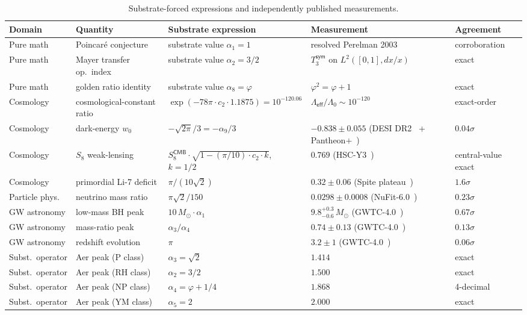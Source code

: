 \documentclass[11pt,a4paper]{amsart}
\theoremstyle{plain}
\theoremstyle{definition}
\begin{document}
\begin{table}[h]
\centering
\caption{Substrate-forced expressions and independently published measurements.}\label{tab:appearances}
\footnotesize
\begin{tabular}{p{1.6cm} p{2.6cm} p{4.5cm} p{2.9cm} p{1.7cm}}
\toprule
Domain & Quantity & Substrate expression & Measurement & Agreement \\
\midrule
Pure math & Poincar\'e conjecture & substrate value $\alpha_1 = 1$ & resolved Perelman 2003~\cite{perelman2003} & corroboration \\
Pure math & Mayer transfer op.\ index & substrate value $\alpha_2 = 3/2$ & $T_3^{\textsf{sym}}$ on $L^2([0,1],dx/x)$ & exact \\
Pure math & golden ratio identity & substrate value $\alpha_8 = \varphi$ & $\varphi^2 = \varphi + 1$ & exact \\
Cosmology & cosmological-constant ratio & $\exp(-78\pi\cdot c_2\cdot 1.1875) = 10^{-120.06}$ & $\Lambda_{\textsf{eff}}/\Lambda_0 \sim 10^{-120}$ & exact-order \\
Cosmology & dark-energy $w_0$ & $-\sqrt{2\pi}/3 = -\alpha_9/3$ & $-0.838 \pm 0.055$ (DESI DR2~\cite{desidr2} + Pantheon$+$~\cite{pantheonplus}) & $0.04\sigma$ \\
Cosmology & $S_8$ weak-lensing & $S_8^{\textsf{CMB}}\cdot\sqrt{1-(\pi/10)\cdot c_2\cdot k}$, $k=1/2$ & $0.769$ (HSC-Y3~\cite{hscy3}) & central-value exact \\
Cosmology & primordial Li-7 deficit & $\pi/(10\sqrt{2})$ & $0.32 \pm 0.06$ (Spite plateau~\cite{spite1982,fields2020}) & $1.6\sigma$ \\
Particle phys.\ & neutrino mass ratio & $\pi\sqrt{2}/150$ & $0.0298 \pm 0.0008$ (NuFit-6.0~\cite{nufit2024}) & $0.23\sigma$ \\
GW astronomy & low-mass BH peak & $10\,M_\odot \cdot \alpha_1$ & $9.8^{+0.3}_{-0.6}\,M_\odot$ (GWTC-4.0~\cite{gwtc4}) & $0.67\sigma$ \\
GW astronomy & mass-ratio peak & $\alpha_3/\alpha_4$ & $0.74 \pm 0.13$ (GWTC-4.0~\cite{gwtc4}) & $0.13\sigma$ \\
GW astronomy & redshift evolution & $\pi$ & $3.2 \pm 1$ (GWTC-4.0~\cite{gwtc4}) & $0.06\sigma$ \\
Subst.\ operator & Aer peak (P class) & $\alpha_3 = \sqrt{2}$ & $1.414$ & exact \\
Subst.\ operator & Aer peak (RH class) & $\alpha_2 = 3/2$ & $1.500$ & exact \\
Subst.\ operator & Aer peak (NP class) & $\alpha_4 = \varphi+1/4$ & $1.868$ & 4-decimal \\
Subst.\ operator & Aer peak (YM class) & $\alpha_5 = 2$ & $2.000$ & exact \\
\bottomrule
\end{tabular}
\end{table}
\end{document}
